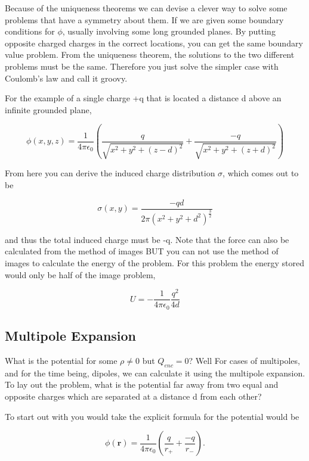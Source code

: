 \documentclass[preprint, review,12pt]{elsarticle}
\def\k{\frac{1}{4 \pi \epsilon_0}}
\def\b{\textbf}
\begin{document}
Because of the uniqueness theorems we can devise a clever way to solve some problems that have a symmetry about them. If we are given some boundary conditions for $\phi$, usually involving some long grounded planes. By putting opposite charged charges in the correct locations, you can get the same boundary value problem. From the uniqueness theorem, the solutions to the two different problems must be the same. Therefore you just solve the simpler case with Coulomb's law and call it groovy.

For the example of a single charge +q that is located a distance d above an infinite grounded plane, 

\begin{equation}
    \phi(x,y,z) = \frac{1}{4 \pi \epsilon_0}(\frac{q}{\sqrt{x^2+y^2+(z-d)^2}} + \frac{-q}{\sqrt{x^2+y^2+(z+d)^2}})
\end{equation}

From here you can derive the induced charge distribution $\sigma$, which comes out to be

\begin{equation}
    \sigma(x,y) = \frac{-qd}{2\pi (x^2+y^2+d^2)^{\frac{3}{2}}}
\end{equation}

and thus the total induced charge must be -q. Note that the force can also be calculated from the method of images BUT you can not use the method of images to calculate the energy of the problem. For this problem the energy stored would only be half of the image problem,

\begin{equation}
    U = -\k\frac{q^2}{4d}
\end{equation}

\subsection{Multipole Expansion}

What is the potential for some $\rho \neq 0$ but $Q_{enc} = 0$? Well For cases of multipoles, and for the time being, dipoles, we can calculate it using the multipole expansion. To lay out the problem, what is the potential far away from two equal and opposite charges which are separated at a distance d from each other?

To start out with you would take the explicit formula for the potential would be 

\begin{equation}
    \phi(\b{r}) = \frac{1}{4\pi \epsilon_0}(\frac{q}{r_+}+\frac{-q}{r_-}).
\end{equation}
\end{document}
